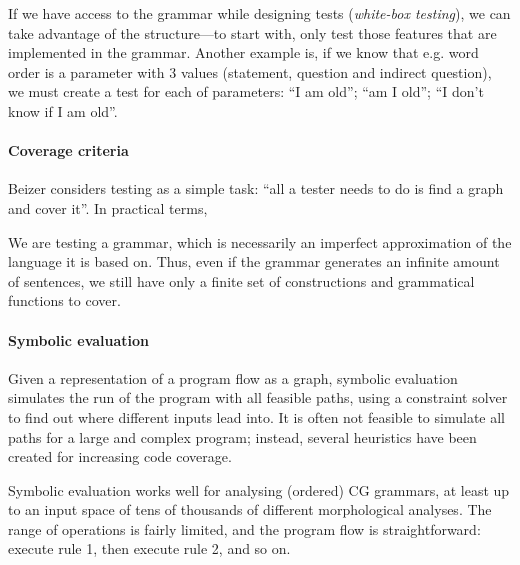 If we have access to the grammar while designing tests
(\emph{white-box testing}), we can take advantage of the
structure---to start with, only test those features that are
implemented in the grammar. Another example is, if we know that
e.g. word order is a parameter with 3 values (statement, question and
indirect question), we must create a test for each of parameters: ``I am
old''; ``am I old''; ``I don't know if I am old''.



\paragraph{Coverage criteria}

Beizer \cite{beizer2003software} considers testing as a simple task: ``all a
tester needs to do is find a graph and cover it''. In practical terms, 


We are testing a grammar, which is necessarily an imperfect
approximation of the language it is based on. Thus, even if the
grammar generates an infinite amount of sentences, we still have only
a finite set of constructions and grammatical functions to cover.

\paragraph{Symbolic evaluation}

Given a representation of a program flow as a graph, symbolic
evaluation simulates the run of the program with all feasible paths,
using a constraint solver to find out where different inputs lead
into. It is often not feasible to simulate all paths for a large and
complex program; instead, several heuristics have been created for
increasing code coverage.

Symbolic evaluation works well for analysing (ordered) CG grammars, at
least up to an input space of tens of thousands of different
morphological analyses. The range of operations is fairly limited, and
the program flow is straightforward: execute rule 1, then execute
rule 2, and so on.



